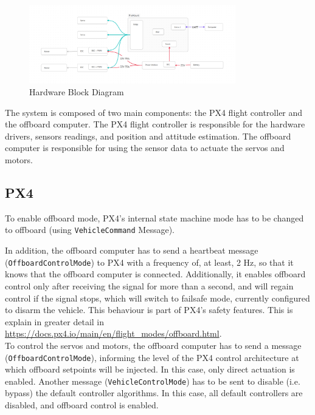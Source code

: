 \documentclass[a4paper]{article}
\begin{document}
\begin{figure}[H]
    \centering
    \includegraphics[width=0.8\textwidth]{imgs/Hardware Diagram.png}
    \caption{Hardware Block Diagram}
    \label{fig:hardware_block_diagram}
\end{figure}

The system is composed of two main components: the PX4 flight controller and the offboard computer. 
The PX4 flight controller is responsible for the hardware drivers, sensors readings, and position and attitude estimation. 
The offboard computer is responsible for using the sensor data to actuate the servos and motors. 

\subsection{PX4}

To enable offboard mode, PX4's internal state machine mode has to be changed to offboard (using \verb|VehicleCommand| Message).

In addition, the offboard computer has to send a heartbeat message (\verb|OffboardControlMode|) to PX4 with a frequency of, at least, 2 Hz, so that it knows that the offboard computer is connected. Additionally, it enables offboard control only after receiving the signal for more than a second, and will regain control if the signal stops, which will switch to failsafe mode, currently configured to disarm the vehicle. This behaviour is part of PX4's safety features. 
This is explain in greater detail in \url{https://docs.px4.io/main/en/flight_modes/offboard.html}. \\

To control the servos and motors, the offboard computer has to send a message (\verb|OffboardControlMode|), informing the level of the PX4 control architecture at which offboard setpoints will be injected. In this case, only direct actuation is enabled. 
Another message (\verb|VehicleControlMode|) has to be sent to disable (i.e. bypass) the default controller algorithms. In this case, all default controllers are disabled, and offboard control is enabled. 
\end{document}
